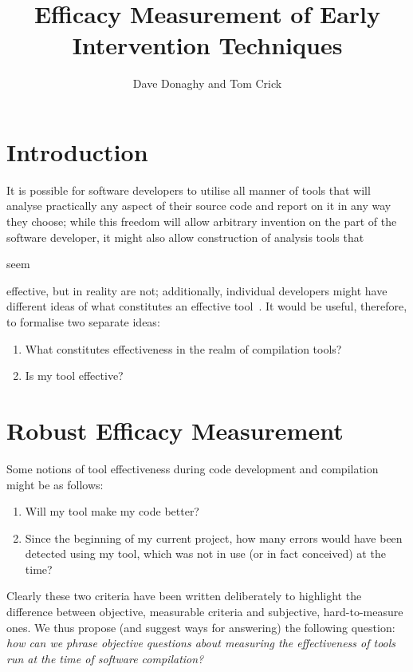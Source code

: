 \documentclass{eceasst}
\title{Efficacy Measurement of Early Intervention Techniques} %
\author{%
Dave Donaghy\autref{1} and
Tom Crick\autref{2}}
\institute{%
\autlabel{1} \email{dave.donaghy@hp.com}\\
HP Bristol, UK\par
\autlabel{2} \email{tcrick@cardiffmet.ac.uk}\\
Department of Computing\\
Cardiff Metropolitan University, UK}
\begin{document}
\maketitle

\section{Introduction}

It is possible for software developers to utilise all manner of tools
that will analyse practically any aspect of their source code and
report on it in any way they choose; while this freedom will allow
arbitrary invention on the part of the software developer, it might
also allow construction of analysis tools that \begin{em}seem\end{em}
effective, but in reality are not; additionally, individual developers
might have different ideas of what constitutes an effective
tool~\cite{zaidman-et-al:2008}. It would be useful, therefore, to formalise two
separate ideas:

\begin{enumerate}
\item What constitutes effectiveness in the realm of compilation tools?
\item Is my tool effective?
\end{enumerate}

\section{Robust Efficacy Measurement}

Some notions of tool effectiveness during code development and compilation
might be as follows:

\begin{enumerate}
\item Will my tool make my code better?
\item Since the beginning of my current project, how many errors would
have been detected using my tool, which was not in use (or in fact
conceived) at the time?
\end{enumerate}

Clearly these two criteria have been written deliberately to highlight
the difference between objective, measurable criteria and subjective,
hard-to-measure ones. We thus propose (and suggest ways for answering)
the following question: {\emph{how can we phrase objective questions about
measuring the effectiveness of tools run at the time of software
compilation?}}
\end{document}
